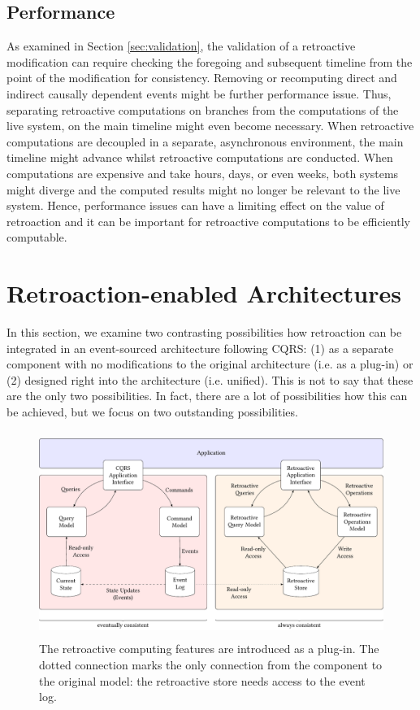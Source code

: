 \subsection{Performance}
\label{sec:perf}
As examined in Section \ref{sec:validation}, the validation of a retroactive 
modification can require checking the foregoing and subsequent timeline 
from the point of the modification for consistency. Removing or recomputing 
direct and indirect causally dependent events might be further performance 
issue. Thus, separating retroactive computations on branches from the 
computations of the live system, on the main timeline might even become necessary. 
%
When retroactive computations are decoupled in a separate, asynchronous environment, 
the main timeline might advance whilst retroactive computations are conducted. 
When computations are expensive and take hours, days, or even weeks, both
systems might diverge and the computed results might no longer be relevant to the 
live system.
Hence, performance issues can have a limiting effect on the value of retroaction and 
it can be important for retroactive computations to be efficiently computable.

\section{Retroaction-enabled Architectures}
\label{sec:arch}
In this section, we examine two contrasting possibilities how retroaction can be 
integrated in an event-sourced architecture following CQRS: 
(1) as a separate component with no modifications to the original architecture 
(i.e.  as a plug-in) or (2) designed right into the architecture (i.e. unified).
This is not to say that these are the only two possibilities. In fact, there 
are a lot of possibilities how this can be achieved, but we focus on two 
outstanding possibilities. 

\begin{figure}[!t]
	\centering
	\includegraphics[height=6.7cm]{../illustrations/cqrs-focus-separate.pdf}
	\caption{
		The retroactive computing features are introduced as a plug-in.
		The dotted connection marks the only connection from the component to the 
		original model: the retroactive store needs access to the event log.
	}
	\label{fig:rc-separate}
\end{figure}


